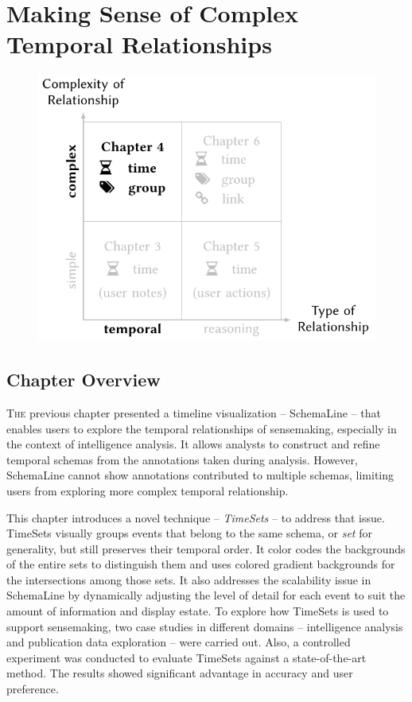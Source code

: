\chapter{Making Sense of Complex Temporal Relationships}
\label{chap:timesets}

\graphicspath{{Chapter4/figures/}}

\begin{figure}[!h]
	\centering
	\includegraphics{work}
\end{figure}

\pagebreak

\section{Chapter Overview}
\lettrine{T}{he} previous chapter presented a timeline visualization -- SchemaLine -- that enables users to explore the temporal relationships of sensemaking, especially in the context of intelligence analysis. It allows analysts to construct and refine temporal schemas from the annotations taken during analysis. However, SchemaLine cannot show annotations contributed to multiple schemas, limiting users from exploring more complex temporal relationship.

This chapter introduces a novel technique -- \emph{TimeSets} -- to address that issue. TimeSets visually groups events that belong to the same schema, or \emph{set} for generality, but still preserves their temporal order. It color codes the backgrounds of the entire sets to distinguish them and uses colored gradient backgrounds for the intersections among those sets. It also addresses the scalability issue in SchemaLine by dynamically adjusting the level of detail for each event to suit the amount of information and display estate. To explore how TimeSets is used to support sensemaking, two case studies in different domains -- intelligence analysis and publication data exploration -- were carried out. Also, a controlled experiment was conducted to evaluate TimeSets against a state-of-the-art method. The results showed significant advantage in accuracy and user preference.

